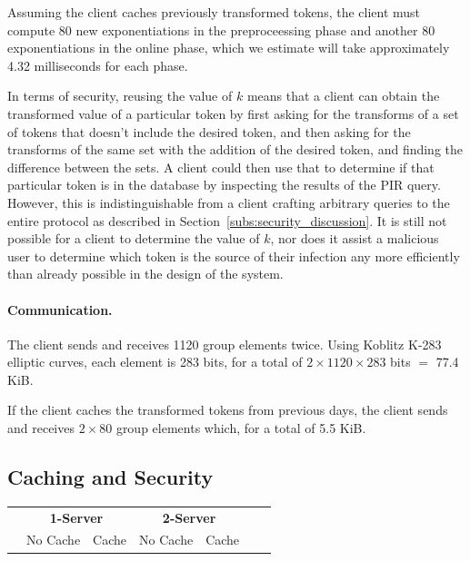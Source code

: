 \documentclass[11pt]{article} %
\begin{document}
{	Assuming the client caches previously transformed tokens, the client must compute 80 new exponentiations in the preproceessing phase and another 80 exponentiations in the online phase, which we estimate will take approximately 4.32 milliseconds for each phase.
	
	In terms of security, reusing the value of $k$ means that a client can obtain the transformed value of a particular token by first asking for the transforms of a set of tokens that doesn't include the desired token, and then asking for the transforms of the same set with the addition of the desired token, and finding the difference between the sets. A client could then use that to determine if that particular token is in the database by inspecting the results of the PIR query. However, this is indistinguishable from a client crafting arbitrary queries to the entire protocol as described in Section~\ref{subs:security_discussion}. It is still not possible for a client to determine the value of $k$, nor does it assist a malicious user to determine  which token is the source of their infection any more efficiently than already possible in the design of the system.
	
	\paragraph{Communication.} The client sends and receives 1120 group elements twice. Using Koblitz K-283 elliptic curves, each element is 283 bits, for a total of $2 \times 1120 \times 283$ bits $=$ 77.4 KiB.
	
	If the client caches the transformed tokens   from previous days, the client sends and receives $2\times 80$ group elements which, for a total of 5.5 KiB.
	
	\subsection{Caching and Security}

\begin{table}[]
	\centering
	\begin{tabular}{|l||r|r|r|r||r|r|r|r|r|r|}
		\hline
		& \multicolumn{4}{c||}{\textbf{1-Server}} & \multicolumn{4}{c|}{\textbf{2-Server}} \\
		& \multicolumn{2}{c|}{No Cache}
		& \multicolumn{2}{c||}{Cache}
		& \multicolumn{2}{c|}{No Cache }& \multicolumn{2}{c|}{ Cache} \\ 
		

\end{tabular}
\end{table}}
\end{document}
